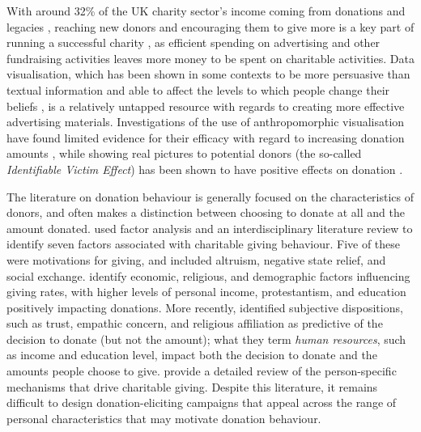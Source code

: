 \documentclass[
  authoryear,
  preprint,
  3p]{elsarticle}
\begin{document}
With around 32\% of the UK charity sector's income coming from donations
and legacies \citep{gov_report}, reaching new donors and encouraging
them to give more is a key part of running a successful charity
\citep{sargeant_2001, wymer_2006}, as efficient spending on advertising
and other fundraising activities leaves more money to be spent on
charitable activities. Data visualisation, which has been shown in some
contexts to be more persuasive than textual information
\citep{pandey_2014} and able to affect the levels to which people change
their beliefs \citep{karduni_2021, markant_2023, strain_2025}, is a
relatively untapped resource with regards to creating more effective
advertising materials. Investigations of the use of anthropomorphic
visualisation have found limited evidence for their efficacy with regard
to increasing donation amounts \citep{boy_2017, morais_2021}, while
showing real pictures to potential donors (the so-called
\emph{Identifiable Victim Effect}) has been shown to have positive
effects on donation \citep{genevsky_2013}.

The literature on donation behaviour is generally focused on the
characteristics of donors, and often makes a distinction between
choosing to donate at all and the amount donated. \citet{green_1997}
used factor analysis and an interdisciplinary literature review to
identify seven factors associated with charitable giving behaviour. Five
of these were motivations for giving, and included altruism, negative
state relief, and social exchange. \citet{gittell_2006} identify
economic, religious, and demographic factors influencing giving rates,
with higher levels of personal income, protestantism, and education
positively impacting donations. More recently, \citet{neumayr_2019}
identified subjective dispositions, such as trust, empathic concern, and
religious affiliation as predictive of the decision to donate (but not
the amount); what they term \emph{human resources}, such as income and
education level, impact both the decision to donate and the amounts
people choose to give. \citet{bekkers_2011} provide a detailed review of
the person-specific mechanisms that drive charitable giving. Despite
this literature, it remains difficult to design donation-eliciting
campaigns that appeal across the range of personal characteristics that
may motivate donation behaviour.
\end{document}
